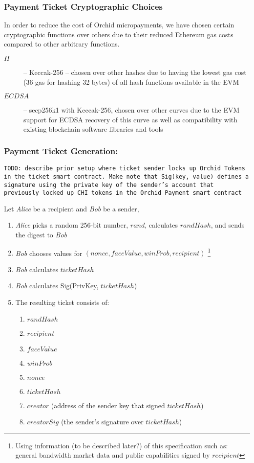 \subsubsection{Payment Ticket Cryptographic Choices}
\label{payments-optimization}
In order to reduce the cost of Orchid micropayments, we have chosen certain cryptographic functions over others due to their reduced Ethereum gas costs compared to other arbitrary functions.
\begin{description}
    \item[$H$] -- Keccak-256 -- chosen over other hashes due to having the lowest gas cost (36 gas\cite{ETHSpec} for hashing 32 bytes) of all hash functions available in the EVM
    \item[$ECDSA$] -- secp256k1 with Keccak-256, chosen over other curves due to the EVM support for ECDSA recovery of this curve as well as compatibility with existing blockchain software libraries and tools
\end{description}

\subsubsection{Payment Ticket Generation:}
\label{payment-generation}
      {\color{red} \texttt{TODO: describe prior setup where ticket sender locks up Orchid Tokens in the ticket smart contract. Make note that Sig(key, value) defines a signature using the private key of the sender's account that previously locked up CHI tokens in the Orchid Payment smart contract}}

Let \textit{Alice} be a recipient and \textit{Bob} be a sender,
\begin{enumerate}
  \item \textit{Alice} picks a random 256-bit number, $rand$, calculates $randHash$, and sends the digest to \textit{Bob}
  \item \textit{Bob} chooses values for $(nonce, faceValue, winProb, recipient)$ \footnote{Using information {\color{red}(to be described later?}) of this specification such as: general bandwidth market data and public capabilities signed by $recipient$}
  \item \textit{Bob} calculates $ticketHash$
  \item \textit{Bob} calculates Sig(PrivKey, $ticketHash$)
  \item The resulting ticket consists of:
    \begin{enumerate}
      \item $randHash$
      \item $recipient$
      \item $faceValue$
      \item $winProb$
      \item $nonce$
      \item $ticketHash$
      \item $creator$ (address of the sender key that signed $ticketHash$)
      \item $creatorSig$ (the sender's signature over $ticketHash$)
     \end{enumerate}
\end{enumerate}

